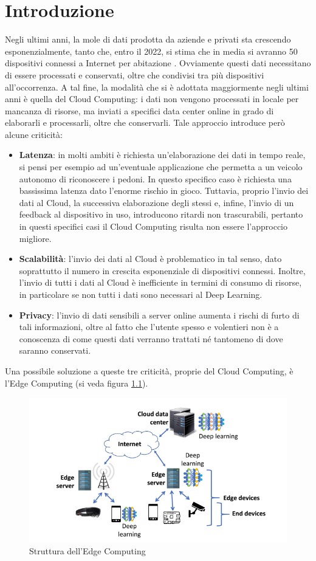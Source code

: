\chapter{Introduzione}
Negli ultimi anni, la mole di dati prodotta da aziende e privati sta crescendo esponenzialmente, tanto che, entro il 2022, si stima che in media si avranno 50 dispositivi connessi a Internet per abitazione \cite{iotedge}. Ovviamente questi dati necessitano di essere processati e conservati, oltre che condivisi tra più dispositivi all'occorrenza. A tal fine, la modalità che si è adottata maggiormente negli ultimi anni è quella del Cloud Computing: i dati non vengono processati in locale per mancanza di risorse, ma inviati a specifici data center online in grado di elaborarli e processarli, oltre che conservarli. Tale approccio introduce però alcune criticità:
\begin{itemize}
	\item \textbf{Latenza}: in molti ambiti è richiesta un'elaborazione dei dati in tempo reale, si pensi per esempio ad un'eventuale applicazione che permetta a un veicolo autonomo di riconoscere i pedoni. In questo specifico caso è richiesta una bassissima latenza dato l'enorme rischio in gioco. Tuttavia, proprio l'invio dei dati al Cloud, la successiva elaborazione degli stessi e, infine, l'invio di un feedback al dispositivo in uso, introducono ritardi non trascurabili, pertanto in questi specifici casi il Cloud Computing risulta non essere l'approccio migliore.
	\item \textbf{Scalabilità}: l'invio dei dati al Cloud è problematico in tal senso, dato soprattutto il numero in crescita esponenziale di dispositivi connessi. Inoltre, l'invio di tutti i dati al Cloud è inefficiente in termini di consumo di risorse, in particolare se non tutti i dati sono necessari al Deep Learning.
	\item \textbf{Privacy}: l'invio di dati sensibili a server online aumenta i rischi di furto di tali informazioni, oltre al fatto che l'utente spesso e volentieri non è a conoscenza di come questi dati verranno trattati né tantomeno di dove saranno conservati.
\end{itemize}
Una possibile soluzione a queste tre criticità, proprie del Cloud Computing, è l'Edge Computing (si veda figura \ref{edge}). 
\begin{figure}[H]
	\centering
	\includegraphics[width=\linewidth, height= 0.3 \textheight]{pics/edgecomputing.jpeg}
	\caption{Struttura dell'Edge Computing}
	\label{edge}
\end{figure}
